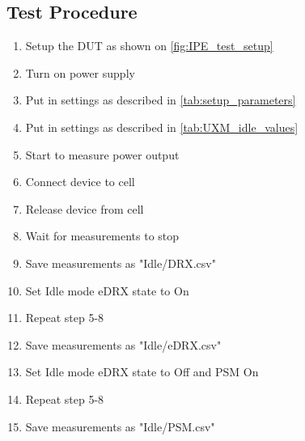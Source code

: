 \subsection{Test Procedure}
\begin{enumerate}
\item Setup the \gls{DUT} as shown on \autoref{fig:IPE_test_setup}
\item Turn on power supply 
\item Put in settings as described in \autoref{tab:setup_parameters}
\item Put in settings as described in \autoref{tab:UXM_idle_values}  
\item Start to measure power output
\item Connect device to cell
\item Release device from cell
\item Wait for measurements to stop
\item Save measurements as "Idle/DRX.csv"
\item Set Idle mode eDRX state to On
\item Repeat step 5-8
\item Save measurements as "Idle/eDRX.csv"
\item Set Idle mode eDRX state to Off and PSM On
\item Repeat step 5-8
\item Save measurements as "Idle/PSM.csv"
\end{enumerate}


